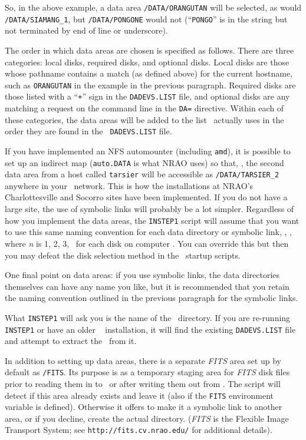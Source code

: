 So, in the above example, a data area {\tt /DATA/ORANGUTAN} will be
selected, as would {\tt /DATA/SIAMANG\_1}, but {\tt /DATA/PONGONE} would
not (``{\tt PONGO}'' is in the string but not terminated by end of line
or underscore).

The order in which data areas are chosen is specified as follows.
There are three categories: local disks, required disks, and optional
disks.  Local disks are those whose pathname contains a match (as
defined above) for the current hostname, such as {\tt ORANGUTAN} in the
example in the previous paragraph.  Required disks are those listed with
a ``{\tt +}'' sign in the {\tt DADEVS.LIST} file, and optional disks are
any matching a request on the command line in the {\tt DA=} directive.
Within each of these categories, the data areas will be added to the
list \ttaips\ actually uses in the order they are found in the {\tt
DADEVS.LIST} file.

If you have implemented an NFS automounter (including {\tt amd}), it is
possible to set up an indirect map ({\tt auto.DATA} is what NRAO uses)
so that, \eg, the second data area from a host called {\tt tarsier} will
be accessible as {\tt /DATA/TARSIER\_2} anywhere in your \AIPS\ network.
This is how the installations at NRAO's Charlottesville and Socorro
sites have been implemented.  If you do not have a large site, the use
of symbolic links will probably be a lot simpler.  Regardless of how you
implement the data areas, the {\tt INSTEP1} script will assume that you
want to use this same naming convention for each data directory or
symbolic link, \ie, \DATAROOT{\tt /}, where {\it n}
is 1, 2, 3, \etc\ for each disk on computer \HOST.  You can override
this but then you may defeat the disk selection method in the
\AIPS\ startup scripts.

One final point on data areas: if you use symbolic links, the data
directories themselves can have any name you like, but it is recommended
that you retain the naming convention outlined in the previous paragraph
for the symbolic links.

\medskip{}

What {\tt INSTEP1} will ask you is the name of the \DATAROOT\ directory.
If you are re-running {\tt INSTEP1} or have an older \AIPS\ %
installation, it will find the existing {\tt DA\-DEVS.LIST} file and
attempt to extract the \DATAROOT\ from it.

In addition to setting up data areas, there is a separate {\it FITS\/}
area set up by default as {\tt\AROOT /FITS}.  Its purpose is as a
temporary staging area for {\it FITS\/} disk files prior to reading them
in to \AIPS\ or after writing them out from \AIPS.  The script will
detect if this area already exists and leave it (also if the {\tt FITS}
environment variable is defined).  Otherwise it offers to make it a
symbolic link to another area, or if you decline, create the actual
directory.  ({\it FITS\/} is the Flexible Image Transport System; see
{\tt http://fits.cv.nrao.edu/} for additional details).

